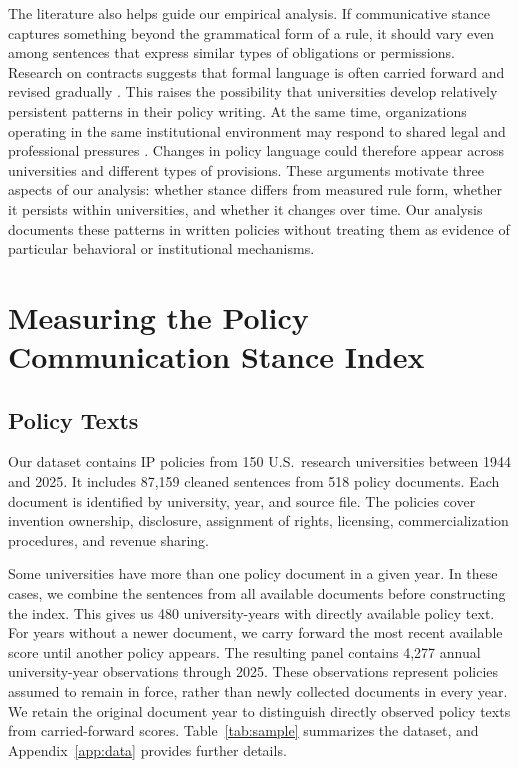 \documentclass[11pt]{article}
\begin{document}
The literature also helps guide our empirical analysis. If communicative stance captures something beyond the grammatical form of a rule, it should vary even among sentences that express similar types of obligations or permissions. Research on contracts suggests that formal language is often carried forward and revised gradually \citep{kahan1997standardization,choi2013dynamics}. This raises the possibility that universities develop relatively persistent patterns in their policy writing. At the same time, organizations operating in the same institutional environment may respond to shared legal and professional pressures \citep{dimaggio1983iron,edelman1992legal}. Changes in policy language could therefore appear across universities and different types of provisions. These arguments motivate three aspects of our analysis: whether stance differs from measured rule form, whether it persists within universities, and whether it changes over time. Our analysis documents these patterns in written policies without treating them as evidence of particular behavioral or institutional mechanisms.


\section{Measuring the Policy Communication Stance Index}\label{sec:measure}

\subsection{Policy Texts}

Our dataset contains IP policies from 150 U.S.\ research universities between 1944 and 2025. It includes 87,159 cleaned sentences from 518 policy documents. Each document is identified by university, year, and source file. The policies cover invention ownership, disclosure, assignment of rights, licensing, commercialization procedures, and revenue sharing.

Some universities have more than one policy document in a given year. In these cases, we combine the sentences from all available documents before constructing the index. This gives us 480 university-years with directly available policy text. For years without a newer document, we carry forward the most recent available score until another policy appears. The resulting panel contains 4,277 annual university-year observations through 2025. These observations represent policies assumed to remain in force, rather than newly collected documents in every year. We retain the original document year to distinguish directly observed policy texts from carried-forward scores. Table~\ref{tab:sample} summarizes the dataset, and Appendix~\ref{app:data} provides further details.
\end{document}
